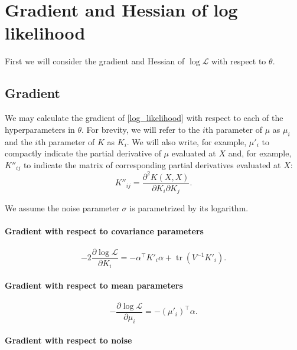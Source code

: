 \documentclass{article}
\newcommand{\cm}[1]{\mathcal{#1}}
\newcommand{\LL}{\cm{L}}
\newcommand{\trans}{^{\top}}
\DeclareMathOperator{\tr}{tr}
\begin{document}
\section{Gradient and Hessian of log likelihood}

First we will consider the gradient and Hessian of $\log \LL$ with
respect to $\theta$.

\subsection{Gradient}

We may calculate the gradient of \eqref{log_likelihood} with respect
to each of the hyperparameters in $\theta$.  For brevity, we will
refer to the $i$th parameter of $\mu$ as $\mu_i$ and the $i$th
parameter of $K$ as $K_i$.  We will also write, for example, $\mu'_i$
to compactly indicate the partial derivative of $\mu$ evaluated at $X$
and, for example, $K''_{ij}$ to indicate the matrix of corresponding
partial derivatives evaluated at $X$:
\begin{equation*}
  K''_{ij} = \frac{\partial^2 K(X, X)}{\partial K_i \partial K_j}.
\end{equation*}

We assume the noise parameter $\sigma$ is parametrized by its logarithm.

\paragraph{Gradient with respect to covariance parameters}

\begin{equation*}
  -2\frac{\partial \log \LL}{\partial K_i}
  =
  -\alpha\trans K'_i \alpha + \tr(V^{-1} K'_i).
\end{equation*}

\paragraph{Gradient with respect to mean parameters}

\begin{equation*}
  -\frac{\partial \log \LL}{\partial \mu_i}
  =
  -(\mu'_i)\trans \alpha.
\end{equation*}

\paragraph{Gradient with respect to noise}
\end{document}
